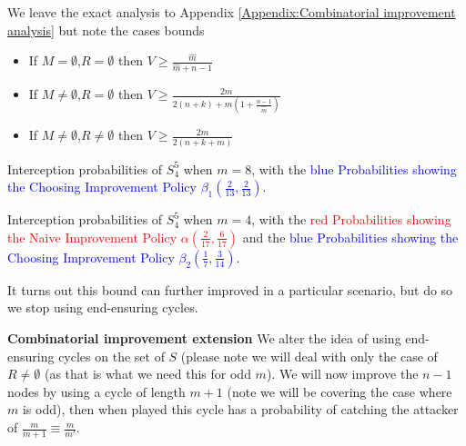 \documentclass[a4paper,10pt]{article}
\theoremstyle{definition}
\theoremstyle{definition}
\theoremstyle{remark}
\theoremstyle{definition}
\begin{document}
We leave the exact analysis to Appendix \ref{Appendix:Combinatorial improvement analysis}  but note the cases bounds

\begin{itemize}
\item If $M=\emptyset$,$R=\emptyset$ then $V \geq \frac{\hat{m}}{\hat{m}+n-1}$
\item If $M \neq \emptyset$,$R=\emptyset$ then $V \geq \frac{2m}{2(n+k)+m(1+\frac{n-1}{\hat{m}})}$
\item If $M \neq \emptyset$,$R \neq \emptyset$ then $V \geq \frac{2m}{2(n+k+m)}$
\end{itemize}

\begin{myfigure}
\begin{center}

\end{center}
\caption{Interception probabilities of $S^5_{4}$ when $m=8$, with the \textcolor{blue}{blue Probabilities showing the Choosing Improvement Policy $\beta_{1} \left(\frac{2}{13},\frac{2}{13} \right)$}.}
\end{myfigure}

\begin{myfigure}
\begin{center}

\end{center}
\caption{Interception probabilities of $S^5_{4}$ when $m=4$, with the \textcolor{red}{red Probabilities showing the Naive Improvement Policy $\alpha \left(\frac{2}{17},\frac{6}{17} \right)$} and the \textcolor{blue}{blue Probabilities showing the Choosing Improvement Policy $\beta_{2} \left(\frac{1}{7},\frac{3}{14} \right)$}.}
\end{myfigure}

It turns out this bound can further improved in a particular scenario, but do so we stop using end-ensuring cycles.

\textbf{Combinatorial improvement extension}
We alter the idea of using end-ensuring cycles on the set of $S$ (please note we will deal with only the case of $R \neq \emptyset$ (as that is what we need this for odd $m$). We will now improve the $n-1$ nodes by using a cycle of length $m+1$ (note we will be covering the case where $m$ is odd), then when played this cycle has a probability of catching the attacker of $\frac{m}{m+1} \equiv \frac{m}{m'}$.
\end{document}
